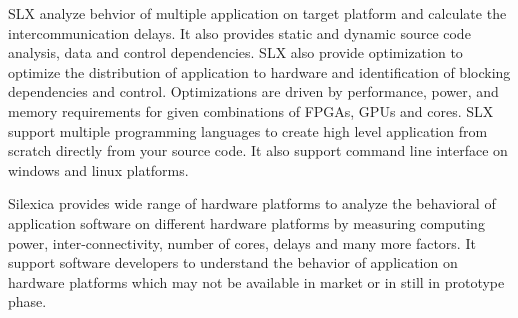 \par SLX analyze behvior of multiple application on target platform  and calculate the intercommunication delays. It also provides static and dynamic source code analysis, data and control dependencies. SLX also provide optimization to optimize the distribution of application to hardware and identification of blocking dependencies and control. Optimizations are driven by performance, power, and memory requirements for given combinations of FPGAs, GPUs and cores.  SLX support multiple programming languages to create high level application from scratch directly from your source code. It also support command line interface on windows and linux platforms. 

\par Silexica provides wide range of hardware platforms to analyze the behavioral of application software on different hardware platforms by measuring computing power, inter-connectivity, number of cores, delays and many more factors. It support software developers to understand the behavior of application on hardware platforms which may not be available in market or in still in prototype phase. 